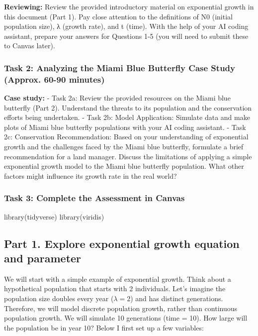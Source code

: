 \documentclass[
]{article}
\newenvironment{Shaded}{\begin{snugshade}}{\end{snugshade}}
\newcommand{\FunctionTok}[1]{\textcolor[rgb]{0.28,0.35,0.67}{#1}}
\newcommand{\NormalTok}[1]{\textcolor[rgb]{0.00,0.23,0.31}{#1}}
\begin{document}
\textbf{Reviewing:} Review the provided introductory material on
exponential growth in this document (Part 1). Pay close attention to the
definitions of N0 (initial population size), λ (growth rate), and t
(time). With the help of your AI coding assistant, prepare your answers
for Questions 1-5 (you will need to submit these to Canvas later).

\subsubsection{Task 2: Analyzing the Miami Blue Butterfly Case Study
(Approx. 60-90
minutes)}\label{task-2-analyzing-the-miami-blue-butterfly-case-study-approx.-60-90-minutes}

\textbf{Case study:} - Task 2a: Review the provided resources on the
Miami blue butterfly (Part 2). Understand the threats to its population
and the conservation efforts being undertaken. - Task 2b: Model
Application: Simulate data and make plots of Miami blue butterfly
populations with your AI coding assistant. - Task 2c: Conservation
Recommendation: Based on your understanding of exponential growth and
the challenges faced by the Miami blue butterfly, formulate a brief
recommendation for a land manager. Discuss the limitations of applying a
simple exponential growth model to the Miami blue butterfly population.
What other factors might influence its growth rate in the real world?

\subsubsection{Task 3: Complete the Assessment in
Canvas}\label{task-3-complete-the-assessment-in-canvas}

\begin{Shaded}
\begin{Highlighting}[]
\FunctionTok{library}\NormalTok{(tidyverse)}
\FunctionTok{library}\NormalTok{(viridis)}
\end{Highlighting}
\end{Shaded}

\subsection{Part 1. Explore exponential growth equation and
parameter}\label{part-1.-explore-exponential-growth-equation-and-parameter}

We will start with a simple example of exponential growth. Think about a
hypothetical population that starts with 2 individuals. Let's imagine
the population size doubles every year (\(\lambda=2\)) and has distinct
generations. Therefore, we will model discrete population growth, rather
than continuous population growth. We will simulate 10 generations (time
= 10). How large will the population be in year 10? Below I first set up
a few variables:
\end{document}
